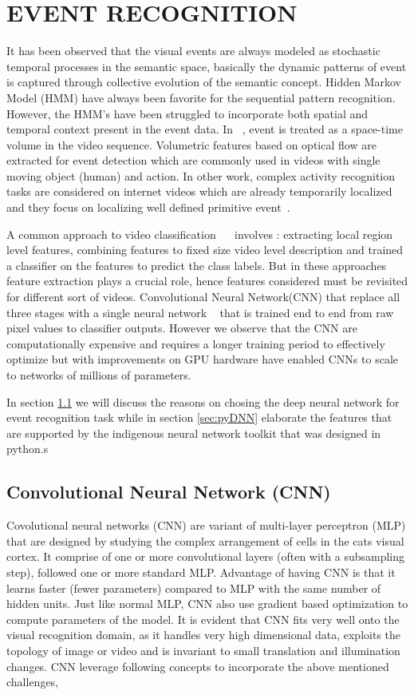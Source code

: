\chapter{EVENT RECOGNITION}
 \label{chap:eventrec}
It has been observed that the visual events are always modeled as stochastic temporal processes in the semantic space, basically the dynamic patterns of event is captured through collective evolution of the semantic concept. Hidden Markov Model (HMM) have always been favorite for the sequential pattern recognition. However, the HMM's have been struggled to incorporate both spatial and temporal context present in the event data.  In ~\cite{YanKe05}, event is treated as a space-time volume in the video sequence. Volumetric features based on optical flow are extracted for event detection which are commonly used in videos with single moving object (human) and action. In other work, complex activity recognition tasks are considered on internet videos which are already temporarily localized and they focus on localizing well defined primitive event~\cite{YanKe07}.
\par A common approach to video classification ~\cite{Liu09}~\cite{Niebles10} involves : extracting local region level features, combining features to fixed size video level description and trained a classifier on the features to predict the class labels. But in these approaches feature extraction plays a crucial role, hence features considered must be revisited for different sort of videos. Convolutional Neural Network(CNN) that replace all three stages with a single neural network ~\cite{Ji13} that is trained end to end from raw pixel values to classifier outputs. However we observe that the CNN are computationally expensive and requires a longer training period to effectively optimize but with improvements on GPU hardware have enabled CNNs to scale to networks of millions of parameters.
\par In section \ref{sec:cnn}  we will discuss the reasons on chosing the deep neural network for event recognition task while in section \ref{sec:pyDNN} elaborate the features that are supported by the indigenous neural network toolkit that was designed in python.s 
 \section{Convolutional Neural Network (CNN)}
 \label{sec:cnn}
 \par Covolutional neural networks (CNN) are variant of multi-layer perceptron (MLP) that are designed by studying the complex arrangement of cells in the cats visual cortex. It comprise of one or more convolutional layers (often with a subsampling step), followed one or more standard MLP.  Advantage of having CNN is that it learns faster (fewer parameters) compared to  MLP with the same number of hidden units. Just like normal MLP, CNN  also use  gradient based optimization to compute parameters of the model. It is  evident that CNN fits very well onto the visual recognition domain, as it handles very high dimensional data, exploits the topology of image or video and is invariant to small translation and illumination changes. 
CNN leverage following concepts to incorporate the above mentioned challenges,
